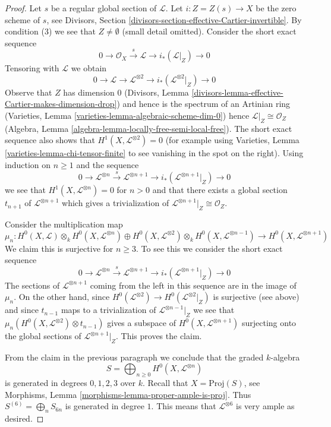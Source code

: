 \begin{proof}
Let $s$ be a regular global section of $\mathcal{L}$. Let
$i : Z = Z(s) \to X$ be the zero scheme of $s$, see
Divisors, Section \ref{divisors-section-effective-Cartier-invertible}.
By condition (3) we see that $Z \not = \emptyset$ (small detail omitted).
Consider the short exact sequence
$$
0 \to \mathcal{O}_X \xrightarrow{s} \mathcal{L} \to
i_*(\mathcal{L}|_Z) \to 0
$$
Tensoring with $\mathcal{L}$ we obtain
$$
0 \to \mathcal{L} \to \mathcal{L}^{\otimes 2} \to
i_*(\mathcal{L}^{\otimes 2}|_Z) \to 0
$$
Observe that $Z$ has dimension $0$
(Divisors, Lemma \ref{divisors-lemma-effective-Cartier-makes-dimension-drop})
and hence is the spectrum of an Artinian ring
(Varieties, Lemma \ref{varieties-lemma-algebraic-scheme-dim-0})
hence $\mathcal{L}|_Z \cong \mathcal{O}_Z$
(Algebra, Lemma \ref{algebra-lemma-locally-free-semi-local-free}).
The short exact sequence also shows that
$H^1(X, \mathcal{L}^{\otimes 2}) = 0$ (for example using
Varieties, Lemma \ref{varieties-lemma-chi-tensor-finite}
to see vanishing in the spot on the right). Using induction
on $n \geq 1$ and the sequence
$$
0 \to \mathcal{L}^{\otimes n} \xrightarrow{s}
\mathcal{L}^{\otimes n + 1} \to
i_*(\mathcal{L}^{\otimes n + 1}|_Z) \to 0
$$
we see that $H^1(X, \mathcal{L}^{\otimes n}) = 0$ for $n > 0$
and that there exists a global section $t_{n + 1}$
of $\mathcal{L}^{\otimes n + 1}$ which gives a trivialization of
$\mathcal{L}^{\otimes n + 1}|_Z \cong \mathcal{O}_Z$.

\medskip\noindent
Consider the multiplication map
$$
\mu_n :
H^0(X, \mathcal{L}) \otimes_k H^0(X, \mathcal{L}^{\otimes n})
\oplus
H^0(X, \mathcal{L}^{\otimes 2}) \otimes_k H^0(X, \mathcal{L}^{\otimes n - 1})
\longrightarrow
H^0(X, \mathcal{L}^{\otimes n + 1})
$$
We claim this is surjective for $n \geq 3$.
To see this we consider the short exact sequence
$$
0 \to \mathcal{L}^{\otimes n} \xrightarrow{s}
\mathcal{L}^{\otimes n + 1} \to i_*(\mathcal{L}^{\otimes n + 1}|_Z) \to 0
$$
The sections of $\mathcal{L}^{\otimes n + 1}$ coming from the left in this
sequence are in the image of $\mu_n$. On the other hand, since
$H^0(\mathcal{L}^{\otimes 2}) \to H^0(\mathcal{L}^{\otimes 2}|_Z)$
is surjective (see above) and since $t_{n - 1}$ maps to a trivialization of
$\mathcal{L}^{\otimes n - 1}|_Z$
we see that $\mu_n(H^0(X, \mathcal{L}^{\otimes 2}) \otimes t_{n - 1})$
gives a subspace
of $H^0(X, \mathcal{L}^{\otimes n + 1})$ surjecting onto the global sections of
$\mathcal{L}^{\otimes n + 1}|_Z$. This proves the claim.

\medskip\noindent
From the claim in the previous paragraph we conclude
that the graded $k$-algebra
$$
S = \bigoplus\nolimits_{n \geq 0} H^0(X, \mathcal{L}^{\otimes n})
$$
is generated in degrees $0, 1, 2, 3$ over $k$.
Recall that $X = \text{Proj}(S)$, see
Morphisms, Lemma \ref{morphisms-lemma-proper-ample-is-proj}.
Thus $S^{(6)} = \bigoplus_{n} S_{6n}$ is generated in degree $1$.
This means that $\mathcal{L}^{\otimes 6}$ is very ample as desired.
\end{proof}

